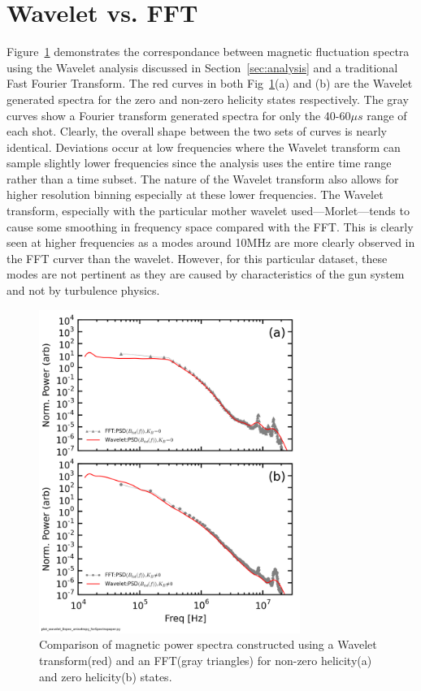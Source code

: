 \documentclass[aip,prl,amsmath,amssymb,reprint,superscriptaddress]{revtex4-1} %
\begin{document}
\section{Wavelet vs. FFT}\label{sec:WaveFFT}

Figure~\ref{fig:WavevsFFT} demonstrates the correspondance between magnetic fluctuation spectra using the Wavelet analysis discussed in Section~\ref{sec:analysis} and a traditional Fast Fourier Transform. The red curves in both Fig~\ref{fig:WavevsFFT}(a) and (b) are the Wavelet generated spectra for the zero and non-zero helicity states respectively. The gray curves show a Fourier transform generated spectra for only the 40-60$\mu s$ range of each shot. Clearly, the overall shape between the two sets of curves is nearly identical. Deviations occur at low frequencies where the Wavelet transform can sample slightly lower frequencies since the analysis uses the entire time range rather than a time subset. The nature of the Wavelet transform also allows for higher resolution binning especially at these lower frequencies. The Wavelet transform, especially with the particular mother wavelet used---Morlet---tends to cause some smoothing in frequency space compared with the FFT. This is clearly seen at higher frequencies as a modes around 10MHz are more clearly observed in the FFT curver than the wavelet. However, for this particular dataset, these modes are not pertinent as they are caused by characteristics of the gun system and not by turbulence physics.

\begin{figure}[!htbp]
\centerline{
\includegraphics[width=8.5cm]{Bperppara_chan1t4_WaveletvsFFT_40t60us}}
\caption{\label{fig:WavevsFFT} Comparison of magnetic power spectra constructed using a Wavelet transform(red) and an FFT(gray triangles) for non-zero helicity(a) and zero helicity(b) states.}
\end{figure}
\end{document}

